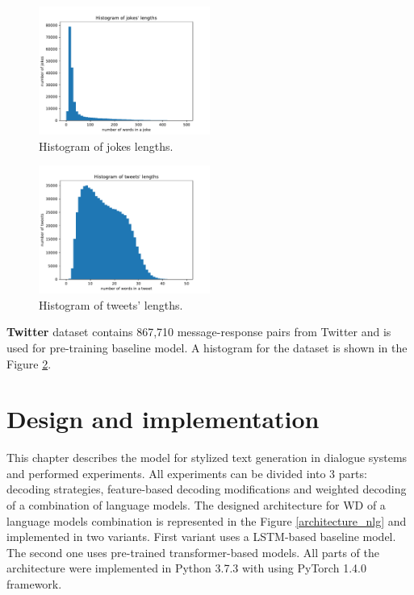 \begin{figure}
  \centering
  \includegraphics[width=0.5\textwidth]{figures/jokes.pdf}
  \caption{Histogram of jokes lengths.}
  \label{fig:jokes}
\end{figure}

\begin{figure}[H]
  \centering
  \includegraphics[width=0.5\textwidth]{figures/tweet.pdf}
  \caption{Histogram of tweets' lengths.}
  \label{fig:tweet}
\end{figure}

\textbf{Twitter} dataset contains 867,710 message-response pairs from Twitter and is used for pre-training baseline model. A histogram for the dataset is shown in the Figure \ref{fig:tweet}.

\chapter{Design and implementation} \label{solution_design}
This chapter describes the model for stylized text generation in dialogue systems and performed experiments. All experiments can be divided into 3 parts: decoding strategies, feature-based decoding modifications and weighted decoding of a combination of language models. The designed architecture for WD of a language models combination is represented in the Figure \ref{architecture_nlg} and implemented in two variants. First variant uses a LSTM-based baseline model. The second one uses pre-trained transformer-based models. All parts of the architecture were implemented in Python 3.7.3 with using PyTorch 1.4.0 framework.

